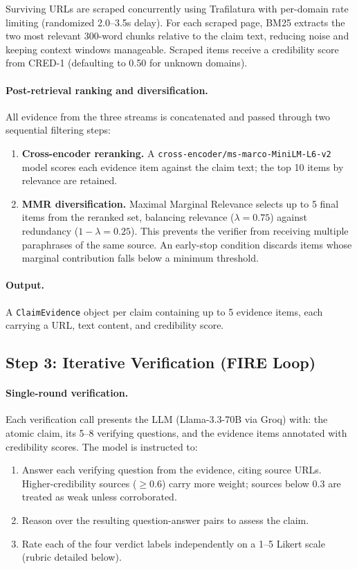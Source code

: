 Surviving URLs are scraped concurrently using Trafilatura with per-domain rate limiting (randomized 2.0--3.5s delay). For each scraped page, BM25 extracts the two most relevant 300-word chunks relative to the claim text, reducing noise and keeping context windows manageable. Scraped items receive a credibility score from CRED-1 (defaulting to 0.50 for unknown domains).

\paragraph{Post-retrieval ranking and diversification.}
All evidence from the three streams is concatenated and passed through two sequential filtering steps:
\begin{enumerate}
  \item \textbf{Cross-encoder reranking.} A \texttt{cross-encoder/ms-marco-MiniLM-L6-v2} model scores each evidence item against the claim text; the top 10 items by relevance are retained.
  \item \textbf{MMR diversification.} Maximal Marginal Relevance selects up to 5 final items from the reranked set, balancing relevance ($\lambda = 0.75$) against redundancy ($1-\lambda = 0.25$). This prevents the verifier from receiving multiple paraphrases of the same source. An early-stop condition discards items whose marginal contribution falls below a minimum threshold.
\end{enumerate}

\paragraph{Output.}
A \texttt{ClaimEvidence} object per claim containing up to 5 evidence items, each carrying a URL, text content, and credibility score.

\subsection{Step 3: Iterative Verification (FIRE Loop)}

\paragraph{Single-round verification.}
Each verification call presents the LLM (Llama-3.3-70B via Groq) with: the atomic claim, its 5--8 verifying questions, and the evidence items annotated with credibility scores. The model is instructed to:
\begin{enumerate}
  \item Answer each verifying question from the evidence, citing source URLs. Higher-credibility sources ($\geq 0.6$) carry more weight; sources below 0.3 are treated as weak unless corroborated.
  \item Reason over the resulting question-answer pairs to assess the claim.
  \item Rate each of the four verdict labels independently on a 1--5 Likert scale (rubric detailed below).
\end{enumerate}

